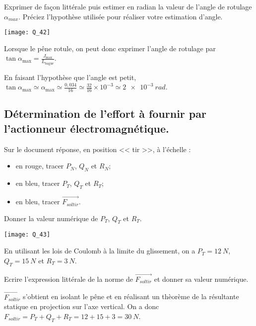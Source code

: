 \documentclass[11pt]{article}
\begin{document}
\UPSTIquestion Exprimer de façon littérale puis estimer en radian la valeur de l'angle de rotulage $\alpha_{max}$.
Préciez l'hypothèse utilisée pour réaliser votre estimation d'angle. 
\begin{UPSTIcorrige}

\begin{center}
\texttt{[image: Q\_42]}
\end{center}

Lorsque le pêne rotule, on peut donc exprimer l'angle de rotulage par $\tan \alpha_{\text{max}} = \frac{J_{\text{max}}}{L_{\text{bague}}}$.

En faisant l'hypothèse que l'angle est petit, 
$\tan \alpha_{\text{max}} \simeq \alpha_{\text{max}} \simeq  \frac{0,034}{16}\simeq  \frac{32}{16} \times 10^{-3}\simeq  \SI{2e-3}{rad}$.
\end{UPSTIcorrige}

\subsection*{Détermination de l'effort à fournir par l'actionneur électromagnétique.}
\UPSTIquestion* Sur le document réponse, en position << tir >>, à l'échelle : 
\begin{itemize}
\item en rouge, tracer $P_N$, $Q_N$ et $R_N$;
\item en bleu, tracer $P_T$, $Q_T$ et $R_T$;
\item en bleu, tracer $\overrightarrow{F_{sol tir}}$.
\end{itemize}
Donner la valeur numérique de $P_T$, $Q_T$ et $R_T$.

\begin{UPSTIcorrige}
\begin{center}
\texttt{[image: Q\_43]}
\end{center}

En utilisant les lois de Coulomb à la limite du glissement, on a $P_T=\SI{12}{N}$, $Q_T=\SI{15}{N}$ et $R_T=\SI{3}{N}$.
\end{UPSTIcorrige}

\UPSTIquestion Ecrire l'expression littérale de la norme de $\overrightarrow{F_{sol tir}}$ et donner sa valeur numérique.
\begin{UPSTIcorrige}

$\overrightarrow{F_{sol tir}}$ s'obtient en isolant le pêne et en réalisant un thèorème de la résultante statique en projection  sur l'axe vertical. On a donc $F_{sol tir} = P_T + Q_T + R_T = 12+15+3 = \SI{30}{N}$.

\end{UPSTIcorrige}
\end{document}
